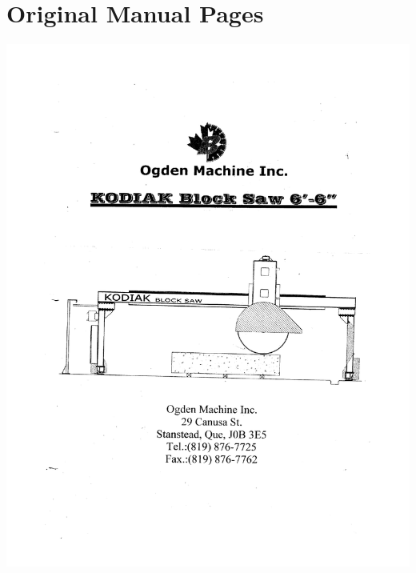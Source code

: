 \section{Original Manual Pages}
\begin{center}
	\includegraphics[width=5.5in]{afiles/manold1.pdf}
	\label{om1} %
\end{center}

